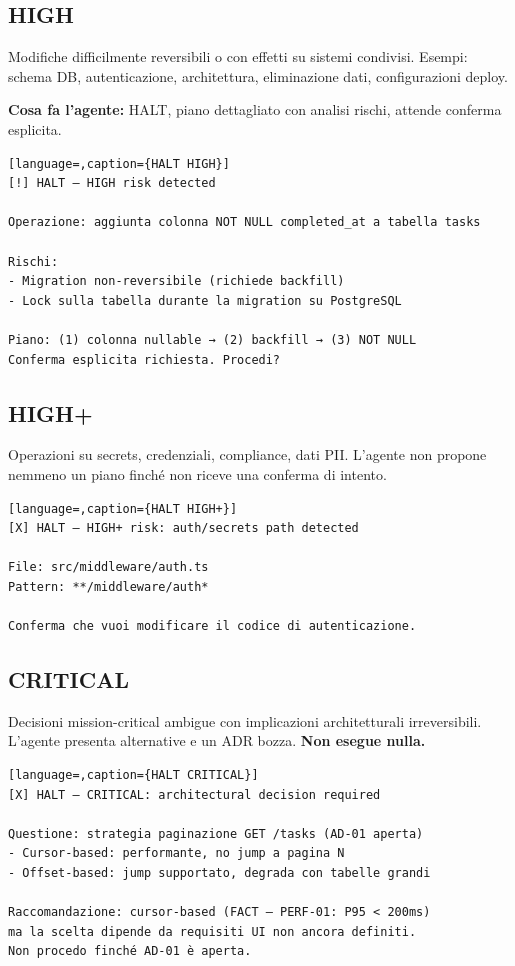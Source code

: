 \subsection*{HIGH}

Modifiche difficilmente reversibili o con effetti su sistemi condivisi. Esempi: schema DB, autenticazione, architettura, eliminazione dati, configurazioni deploy.

\textbf{Cosa fa l'agente:} HALT, piano dettagliato con analisi rischi, attende conferma esplicita.

\begin{lstlisting}[language=,caption={HALT HIGH}]
[!] HALT — HIGH risk detected

Operazione: aggiunta colonna NOT NULL completed_at a tabella tasks

Rischi:
- Migration non-reversibile (richiede backfill)
- Lock sulla tabella durante la migration su PostgreSQL

Piano: (1) colonna nullable → (2) backfill → (3) NOT NULL
Conferma esplicita richiesta. Procedi?
\end{lstlisting}

\subsection*{HIGH+}

Operazioni su secrets, credenziali, compliance, dati PII. L'agente non propone nemmeno un piano finché non riceve una conferma di intento.

\begin{lstlisting}[language=,caption={HALT HIGH+}]
[X] HALT — HIGH+ risk: auth/secrets path detected

File: src/middleware/auth.ts
Pattern: **/middleware/auth*

Conferma che vuoi modificare il codice di autenticazione.
\end{lstlisting}

\subsection*{CRITICAL}

Decisioni mission-critical ambigue con implicazioni architetturali irreversibili. L'agente presenta alternative e un ADR bozza. \textbf{Non esegue nulla.}

\begin{lstlisting}[language=,caption={HALT CRITICAL}]
[X] HALT — CRITICAL: architectural decision required

Questione: strategia paginazione GET /tasks (AD-01 aperta)
- Cursor-based: performante, no jump a pagina N
- Offset-based: jump supportato, degrada con tabelle grandi

Raccomandazione: cursor-based (FACT — PERF-01: P95 < 200ms)
ma la scelta dipende da requisiti UI non ancora definiti.
Non procedo finché AD-01 è aperta.
\end{lstlisting}

